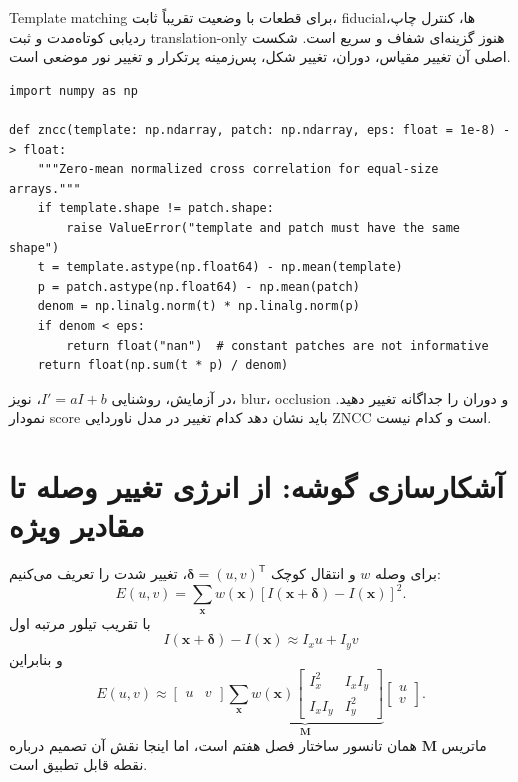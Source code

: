 \documentclass[12pt,openany,oneside]{book}
\newcommand{\trans}{^{\mathsf T}}
\newcommand{\vect}[1]{\bm{#1}}
\newcommand{\mat}[1]{\bm{#1}}
\begin{document}
\begin{applicationbox}
Template matching برای قطعات با وضعیت تقریباً ثابت، fiducialها، کنترل چاپ، ردیابی کوتاه‌مدت و ثبت translation-only هنوز
گزینه‌ای شفاف و سریع است. شکست اصلی آن تغییر مقیاس، دوران، تغییر شکل، پس‌زمینه پرتکرار و تغییر نور موضعی است.
\end{applicationbox}

\begin{workshopbox}
\begin{latin}
\begin{lstlisting}
import numpy as np

def zncc(template: np.ndarray, patch: np.ndarray, eps: float = 1e-8) -> float:
    """Zero-mean normalized cross correlation for equal-size arrays."""
    if template.shape != patch.shape:
        raise ValueError("template and patch must have the same shape")
    t = template.astype(np.float64) - np.mean(template)
    p = patch.astype(np.float64) - np.mean(patch)
    denom = np.linalg.norm(t) * np.linalg.norm(p)
    if denom < eps:
        return float("nan")  # constant patches are not informative
    return float(np.sum(t * p) / denom)
\end{lstlisting}
\end{latin}
در آزمایش، روشنایی $I'=aI+b$، نویز، blur، occlusion و دوران را جداگانه تغییر دهید. نمودار score باید نشان دهد کدام تغییر
در مدل ناوردایی ZNCC است و کدام نیست.
\end{workshopbox}

\section{آشکارسازی گوشه: از انرژی تغییر وصله تا مقادیر ویژه}
برای وصله $w$ و انتقال کوچک $\vect\delta=(u,v)\trans$، تغییر شدت را تعریف می‌کنیم:
\begin{equation}
E(u,v)=\sum_{\vect x}w(\vect x)
\left[I(\vect x+\vect\delta)-I(\vect x)\right]^2.
\end{equation}
با تقریب تیلور مرتبه اول
\[
I(\vect x+\vect\delta)-I(\vect x)\approx I_xu+I_yv
\]
و بنابراین
\begin{equation}
E(u,v)\approx
\begin{bmatrix}u&v\end{bmatrix}
\underbrace{\sum_{\vect x}w(\vect x)
\begin{bmatrix}I_x^2&I_xI_y\\I_xI_y&I_y^2\end{bmatrix}}_{\mat M}
\begin{bmatrix}u\\v\end{bmatrix}.
\label{eq:structure_tensor_feature}
\end{equation}
ماتریس $\mat M$ همان تانسور ساختار فصل هفتم است، اما اینجا نقش آن تصمیم درباره نقطه قابل تطبیق است.
\end{document}
